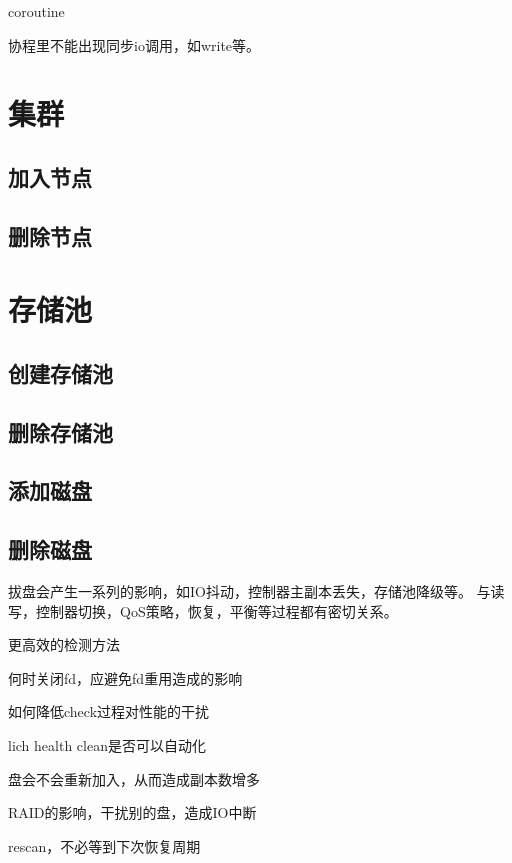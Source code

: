 coroutine
\begin{compactenum}
\item 协程里不能出现同步io调用，如write等。
\end{compactenum}

\section{集群}

\subsection{加入节点}

\subsection{删除节点}

\section{存储池}

\subsection{创建存储池}

\subsection{删除存储池}

\subsection{添加磁盘}


\subsection{删除磁盘}

拔盘会产生一系列的影响，如IO抖动，控制器主副本丢失，存储池降级等。
与读写，控制器切换，QoS策略，恢复，平衡等过程都有密切关系。

\begin{compactenum}
\item 更高效的检测方法
\item 何时关闭fd，应避免fd重用造成的影响
\item 如何降低check过程对性能的干扰
\item lich health clean是否可以自动化
\item 盘会不会重新加入，从而造成副本数增多
\item RAID的影响，干扰别的盘，造成IO中断
\item rescan，不必等到下次恢复周期
\end{compactenum}

